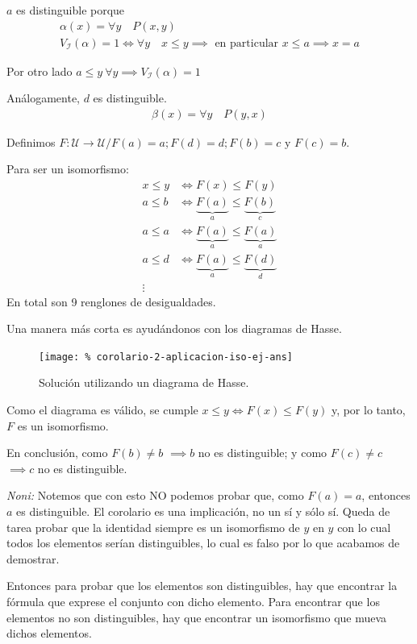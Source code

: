 $a$ es distinguible porque
\begin{gather*}
    \alpha(x) = \forall y \quad P(x,y)\\
    V_{\mathcal{I}}(\alpha) = 1 \iff
    \forall y \quad x \leq y \implies \text{ en particular } x \leq a
    \implies x = a
\end{gather*}

Por otro lado $a \leq y ~ \forall y \implies V_{\mathcal{I}}(\alpha)=1$

Análogamente, $d$ es distinguible.
\begin{gather*}
    \beta(x) = \forall y \quad P(y,x)
\end{gather*}

%
Definimos $F: \mathcal{U} \to \mathcal{U} / F(a) = a; F(d) = d; F(b) = c
\text{ y }F(c) = b$.

Para ser un isomorfismo:
\begin{align*}
    x \leq y &\iff F(x) \leq F(y)\\
    a \leq b &\iff \underbrace{F(a)}_{a} \leq \underbrace{F(b)}_{c}\\
    a \leq a &\iff \underbrace{F(a)}_{a} \leq \underbrace{F(a)}_{a}\\
    a \leq d &\iff \underbrace{F(a)}_{a} \leq \underbrace{F(d)}_{d}\\
    \vdots
\end{align*}
En total son 9 renglones de desigualdades.

Una manera más corta es ayudándonos con los diagramas de Hasse.
\begin{figure}[H]
    \centering
    \texttt{[image: \%
    corolario-2-aplicacion-iso-ej-ans]}
    \caption{Solución utilizando un diagrama de Hasse.}
\end{figure}

Como el diagrama es válido, se cumple $x \leq y \iff F(x) \leq F(y)$ y,
por lo tanto, $F$ es un isomorfismo.

En conclusión, como $F(b) \neq b$ $\implies b$ no es distinguible; y como
$F(c) \neq c$ $\implies c$ no es distinguible.


\bigskip
\textit{Noni:}
Notemos que con esto NO podemos probar que, como $F(a) = a$, entonces $a$ es
distinguible. El corolario es una implicación, no un sí y sólo sí.
Queda de tarea probar que la identidad siempre es un isomorfismo de $y$ en
$y$ con lo cual todos los elementos serían distinguibles, lo cual es falso
por lo que acabamos de demostrar.

Entonces para probar que los elementos son distinguibles, hay que encontrar
la fórmula que exprese el conjunto con dicho elemento. Para encontrar que
los elementos no son distinguibles, hay que encontrar un isomorfismo que
mueva dichos elementos.

